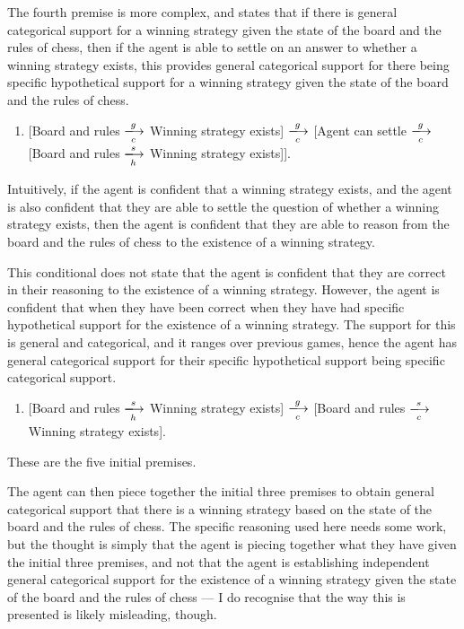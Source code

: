 \documentclass[10pt]{article}
\begin{document}
The fourth premise is more complex, and states that if there is general categorical support for a winning strategy given the state of the board and the rules of chess, then if the agent is able to settle on an answer to whether a winning strategy exists, this provides general categorical support for there being specific hypothetical support for a winning strategy given the state of the board and the rules of chess.

\begin{enumerate}[resume]
\item\label{arg:gcWS+settle-shWS} [Board and rules \(\xlongrightarrow[c]{g}\) Winning strategy exists] \(\xlongrightarrow[c]{g}\) [Agent can settle \(\xlongrightarrow[c]{g}\) [Board and rules \(\xlongrightarrow[h]{s}\) Winning strategy exists]].
\end{enumerate}

Intuitively, if the agent is confident that a winning strategy exists, and the agent is also confident that they are able to settle the question of whether a winning strategy exists, then the agent is confident that they are able to reason from the board and the rules of chess to the existence of a winning strategy.

This conditional does not state that the agent is confident that they are correct in their reasoning to the existence of a winning strategy.
However, the agent is confident that when they have been correct when they have had specific hypothetical support for the existence of a winning strategy.
The support for this is general and categorical, and it ranges over previous games, hence the agent has general categorical support for their specific hypothetical support being specific categorical support.

\begin{enumerate}[resume]
\item\label{arg:shWS-scWS} [Board and rules \(\xlongrightarrow[h]{s}\) Winning strategy exists] \(\xlongrightarrow[c]{g}\) [Board and rules \(\xlongrightarrow[c]{s}\) Winning strategy exists].
\end{enumerate}

These are the five initial premises.

The agent can then piece together the initial three premises to obtain general categorical support that there is a winning strategy based on the state of the board and the rules of chess.
The specific reasoning used here needs some work, but the thought is simply that the agent is piecing together what they have given the initial three premises, and not that the agent is establishing independent general categorical support for the existence of a winning strategy given the state of the board and the rules of chess --- I do recognise that the way this is presented is likely misleading, though.
\end{document}
